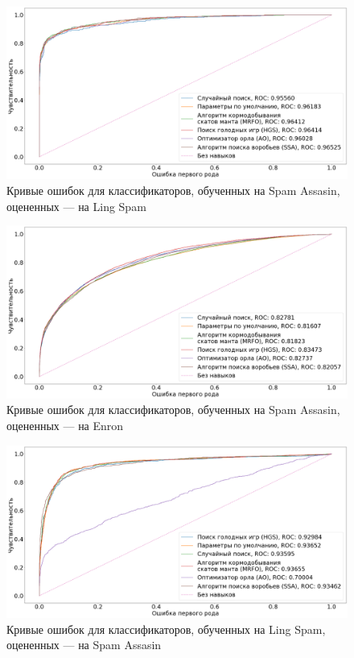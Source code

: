 \begin{figure}[H]
    \centering
    \includegraphics[width=165mm]{static/SA-LS.png}
    \caption{Кривые ошибок для классификаторов, обученных на Spam Assasin, оцененных — на Ling Spam}
    \label{SA-LS}
\end{figure}

\begin{figure}[H]
    \centering
    \includegraphics[width=165mm]{static/SA-EN.png}
    \caption{Кривые ошибок для классификаторов, обученных на Spam Assasin, оцененных — на Enron}
    \label{SA-EN}
\end{figure}

\begin{figure}[H]
    \centering
    \includegraphics[width=165mm]{static/LS-SA.png}
    \caption{Кривые ошибок для классификаторов, обученных на Ling Spam, оцененных — на Spam Assasin}
    \label{LS-SA}
\end{figure}

